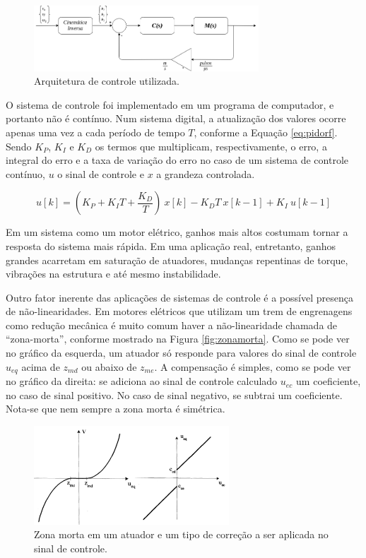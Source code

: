 \begin{figure}[h]
  \centering
  \includegraphics[width = 0.75\textwidth]{imagens/controle}
  \caption{Arquitetura de controle utilizada.}
  \label{fig:controle}
\end{figure}

O sistema de controle foi implementado em um programa de computador, e portanto não é contínuo. Num sistema digital, a atualização dos valores ocorre apenas uma vez a cada período de tempo $T$, conforme a Equação \ref{eq:pidorf}. Sendo $K_P$, $K_I$ e $K_D$ os termos que multiplicam, respectivamente, o erro, a integral do erro e a taxa de variação do erro no caso de um sistema de controle contínuo, $u$ o sinal de controle e $x$ a grandeza controlada. \citep{dorf2008modern}

\begin{equation}
  u[k] = (K_P+K_I T+\frac{K_D}{T})\ x[k] - K_D T\ x[k-1] + K_I\ u[k-1]
  \label{eq:pidorf}
\end{equation}

Em um sistema como um motor elétrico, ganhos mais altos costumam tornar a resposta do sistema mais rápida. Em uma aplicação real, entretanto, ganhos grandes acarretam em saturação de atuadores, mudanças repentinas de torque, vibrações na estrutura e até mesmo instabilidade. \citep{lynch2017modern}

Outro fator inerente das aplicações de sistemas de controle é a possível presença de não-linearidades. Em motores elétricos que utilizam um trem de engrenagens como redução mecânica é muito comum haver a não-linearidade chamada de ``zona-morta'', conforme mostrado na Figura \ref{fig:zonamorta}. Como se pode ver no gráfico da esquerda, um atuador só responde para valores do sinal de controle $u_{eq}$ acima de $z_{md}$ ou abaixo de $z_{me}$. A compensação é simples, como se pode ver no gráfico da direita: se adiciona ao sinal de controle calculado $u_{ec}$ um coeficiente, no caso de sinal positivo. No caso de sinal negativo, se subtrai um coeficiente. Nota-se que nem sempre a zona morta é simétrica.

\begin{figure}[h]
  \centering
  \includegraphics[width = 0.65\textwidth]{imagens/zonamorta0}
  \caption{Zona morta em um atuador e um tipo de correção a ser aplicada no sinal de controle.}
  \label{fig:cont_zm}
\end{figure}

